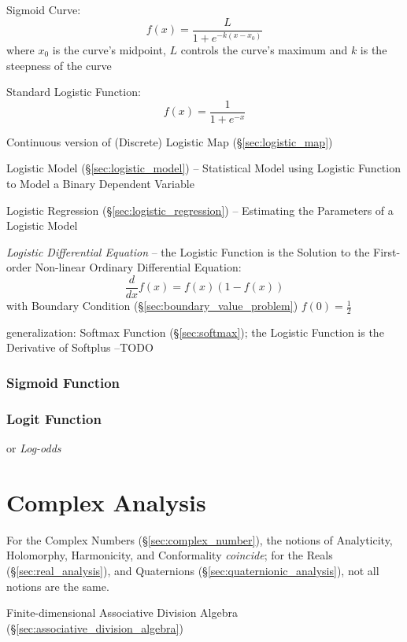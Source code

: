 Sigmoid Curve:
\[
  f(x) = \frac{L}{1 + e^{-k(x-x_0)}}
\]
where $x_0$ is the curve's midpoint, $L$ controls the curve's maximum and $k$ is
the steepness of the curve

Standard Logistic Function:
\[
  f(x) = \frac{1}{1 + e^{-x}}
\]

\fist Continuous version of (Discrete) Logistic Map (\S\ref{sec:logistic_map})

\fist Logistic Model (\S\ref{sec:logistic_model}) -- Statistical Model using
Logistic Function to Model a Binary Dependent Variable

\fist Logistic Regression (\S\ref{sec:logistic_regression}) -- Estimating the
Parameters of a Logistic Model

\emph{Logistic Differential Equation} -- the Logistic Function is the Solution
to the First-order Non-linear Ordinary Differential Equation:
\[
  \frac{d}{dx}f(x) = f(x)(1 - f(x))
\]
with Boundary Condition (\S\ref{sec:boundary_value_problem}) $f(0) =
\frac{1}{2}$

\fist generalization: Softmax Function (\S\ref{sec:softmax}); the Logistic
Function is the Derivative of Softplus --TODO



\subsubsection{Sigmoid Function}\label{sec:sigmoid_function}

\subsubsection{Logit Function}\label{sec:logit_function}

or \emph{Log-odds}



\section{Complex Analysis}\label{sec:complex_analysis}

For the Complex Numbers (\S\ref{sec:complex_number}), the notions of
Analyticity, Holomorphy, Harmonicity, and Conformality \emph{coincide}; for the
Reals (\S\ref{sec:real_analysis}), and Quaternions
(\S\ref{sec:quaternionic_analysis}), not all notions are the same.

Finite-dimensional Associative Division Algebra
(\S\ref{sec:associative_division_algebra})

